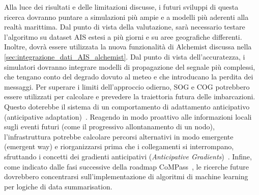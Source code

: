Alla luce dei risultati e delle limitazioni discusse, i futuri sviluppi di questa ricerca dovranno puntare a simulazioni più ampie e a modelli più aderenti alla realtà marittima. Dal punto di vista della valutazione, sarà necessario testare l'algoritmo su dataset \ac{AIS} estesi a più giorni e su aree geografiche differenti. Inoltre, dovrà essere utilizzata la nuova funzionalità di Alchemist discussa nella \cref{sec:integrazione_dati_AIS_alchemist}. Dal punto di vista dell'accuratezza, i simulatori dovranno integrare modelli di propagazione del segnale più complessi, che tengano conto del degrado dovuto al meteo e che introducano la perdita dei messaggi. Per superare i limiti dell'approccio odierno, \ac{SOG} e \ac{COG} potrebbero essere utilizzati per calcolare e prevedere la traiettoria futura delle imbarcazioni. Questo doterebbe il sistema di un comportamento di adattamento anticipativo (anticipative adaptation)~\cite{6394122}. Reagendo in modo proattivo alle informazioni locali sugli eventi futuri (come il progressivo allontanamento di un nodo), l'infrastruttura potrebbe calcolare percorsi alternativi in modo emergente (emergent way) e riorganizzarsi prima che i collegamenti si interrompano, sfruttando i concetti dei gradienti anticipativi (\emph{Anticipative Gradients})~\cite{6394122}. Infine, come indicato dalle fasi successive della roadmap CoMPass~\cite{roadmap}, le ricerche future dovrebbero concentrarsi sull'implementazione di algoritmi di machine learning per logiche di data summarisation.
